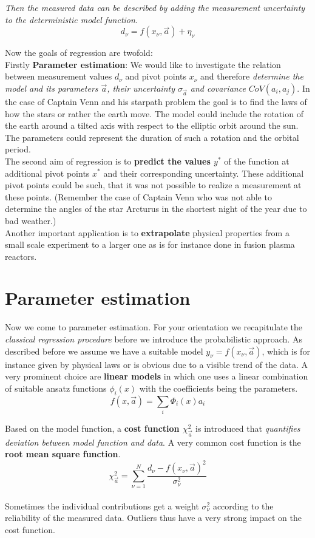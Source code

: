 \documentclass[12pt, a4paper]{scrartcl}
\begin{document}
\textit{Then the measured data can be described by adding the measurement uncertainty to the deterministic 
model function.}\[d_{\nu}=f(x_{\nu},\vec{a})+\eta_{\nu}\]


Now the goals of regression are twofold:\\

Firstly \textbf{Parameter estimation}: We would like to investigate the relation between 
measurement values $d_{\nu}$ and pivot points $x_{\nu}$ and therefore \textit{determine
the model and its parameters $\vec{a}$, their uncertainty $\sigma_{\vec{a}}$ and covariance $CoV(a_i,a_j)$}. 
In the case of Captain Venn and his starpath problem the goal is to find 
the laws of how the stars or rather the earth move. The model could
include the rotation of the earth around a tilted axis with respect to
the elliptic orbit around the sun. The parameters could represent the
duration of such a rotation and the orbital period.\\

The second aim of regression is to \textbf{predict the values $y^*$} of the function at
additional pivot points $x^*$ and their corresponding uncertainty. These
additional pivot points could be such, that it was not possible to realize
a measurement at these points. (Remember the case of Captain Venn
who was not able to determine the angles of the star Arcturus in the
shortest night of the year due to bad weather.)\\

Another important application is to \textbf{extrapolate} physical properties from a small scale
experiment to a larger one as is for instance done in fusion plasma reactors.\\

\section*{Parameter estimation}
Now we come to parameter estimation.
For your orientation we recapitulate the \textit{classical regression procedure} before
we introduce the probabilistic approach.
As described before we assume we have a suitable model $y_{\nu}=f(x_{\nu},\vec{a})$, which is for instance given by physical 
laws or is obvious due to a visible trend of the data. 
A very prominent choice are \textbf{linear models} in which
one uses a linear combination of suitable ansatz functions $\phi_i (x)$ with
the coefficients being the parameters. 
\[f(x,\vec{a})=\sum_i \Phi_i(x)a_i\]

Based on the model function, a \textbf{cost function $\chi^2_{\vec{a}}$} is introduced that \textit{quantifies deviation between 
model function and data}. A very common cost
function is the \textbf{root mean square function}.\\
\begin{equation*}\boxed{\chi^2_{\vec{a}}=\sum_{\nu=1}^N\frac{d_{\nu}-f(x_{\nu},\vec{a})^2}{\sigma_{\nu}^2}
}\end{equation*}\\
 Sometimes the individual contributions get a weight $\sigma_{\nu}^2$
according to the reliability of the measured data.
Outliers thus have a very strong impact on the cost function.\\
\end{document}
